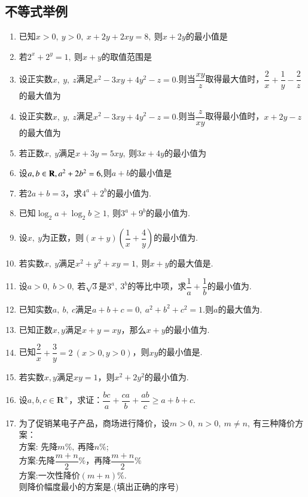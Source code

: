 \documentclass{BHCexam}
\begin{document}
\subsection{不等式举例}
\begin{enumerate}[1)]
\item 已知$ x>0,~y>0 ,~x+2y+2xy=8,~$则$ x+2y $的最小值是\xx
{}
\item 若$ 2^x+2^y=1 ,~$则$ x+y $的取值范围是\xx
{}
\item 设正实数$ x,~y,~z $满足$ x^2-3xy+4y^2-z=0 $.则当$ \dfrac{xy}{z} $取得最大值时，$ \dfrac{2}{x}+\dfrac{1}{y}-\dfrac{2}{z} $的最大值为\xx
{}
\item 设正实数$ x,~y,~z $满足$ x^2-3xy+4y^2-z=0 $.则当$ \dfrac{z}{xy} $取得最小值时，$ x+2y-z $的最大值为\xx
{}
\item 若正数$ x,~y $满足$ x+3y=5xy,~ $则$ 3x+4y $的最小值为\xx
{}
\item 设$ a,b\in\mathbf{R},a^2+2b^2=6, $则$ a+b $的最小值是\xx
{}
\item 若$ 2a+b=3 $，求$ 4^a+2^b $的最小值为\tk.
\item 已知$ \log_2a+\log_2b\ge1 ,~$则$ 3^a+9^b $的最小值为\tk.
\item 设$ x,~y $为正数，则$ (x+y)\left(\dfrac{1}{x}+\dfrac{4}{y}\right) $的最小值为\tk.
\item 若实数$ x,~y $满足$ x^2+y^2+xy=1,~ $则$ x+y $的最大值是\tk.
\item 设$ a>0,~b>0,~ $若$ \sqrt{3} $是$ 3^a,~3^b $的等比中项，求$ \dfrac{1}{a}+\dfrac{1}{b} $的最小值为\tk.
\item 已知实数$ a,~b,~c $满足$ a+b+c=0,~a^2+b^2+c^2=1. $则$ a $的最大值为\tk.
\item 已知正数$x,y$满足$ x+y=xy $，那么$ x+y $的最小值为\tk.
\item 已知$ \dfrac{2}{x}+\dfrac{3}{y}=2~(x>0,y>0 ) $，则$xy$的最小值是\tk.
\item 若实数$ x,y $满足$ xy=1 $，则$ x^2+2y^2 $的最小值为\tk.
\item 设$ a,b,c\in \mathbf{R^+} $，求证：$ \dfrac{bc}{a}+\dfrac{ca}{b}+\dfrac{ab}{c}\ge a+b+c. $
\item 为了促销某电子产品，商场进行降价，设$ m>0,~n>0,~m\ne n,~ $有三种降价方案：\\
方案: 先降$ m\%,~ $再降$n\%  $;\\
方案:先降$ \dfrac{m+n}{2}\% $，再降$ \dfrac{m+n}{2}\% $\\
方案:一次性降价$ \left(m+n\right) \%$.\\
则降价幅度最小的方案是\tk.(填出正确的序号)
\end{enumerate}
\end{document}
